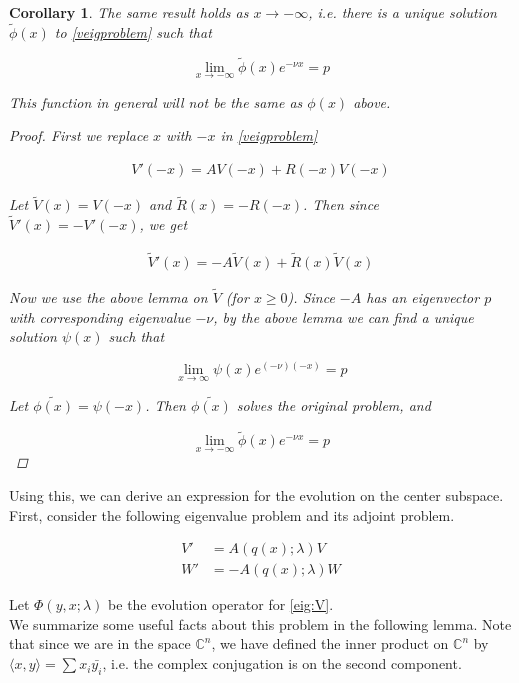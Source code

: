 \documentclass[12pt]{article}
\def\C{{\mathbb C}}
\newtheorem{corollary}{Corollary}
\begin{document}
\begin{corollary}The same result holds as $x \rightarrow -\infty$, i.e. there is a unique solution $\tilde{\phi}(x)$ to \eqref{veigproblem} such that 

\[
\lim_{x\rightarrow -\infty} \tilde{\phi}(x) e^{-\nu x} = p
\]

This function in general will not be the same as $\phi(x)$ above.

\begin{proof}
First we replace $x$ with $-x$ in \eqref{veigproblem}

\begin{align*}
V'(-x) = A V(-x) + R(-x)V(-x)
\end{align*}

Let $\tilde{V}(x) = V(-x)$ and $\tilde{R}(x) = -R(-x)$. Then since $\tilde{V}'(x) = -V'(-x)$, we get

\begin{align*}
\tilde{V}'(x) = -A \tilde{V}(x) + \tilde{R}(x)\tilde{V}(x)
\end{align*}

Now we use the above lemma on $\tilde{V}$ (for $x \geq 0$). Since $-A$ has an eigenvector $p$ with corresponding eigenvalue $-\nu$, by the above lemma we can find a unique solution $\psi(x)$ such that 

\[
\lim_{x\rightarrow \infty} \psi(x) e^{(-\nu)(-x)} = p
\]

Let $\tilde{\phi(x)} = \psi(-x)$. Then $\tilde{\phi(x)}$ solves the original problem, and

\[
\lim_{x\rightarrow -\infty} \tilde{\phi}(x) e^{-\nu x } = p
\]

\end{proof}
\end{corollary}

Using this, we can derive an expression for the evolution on the center subspace. First, consider the following eigenvalue problem and its adjoint problem.

\begin{align}
V' &= A(q(x); \lambda) V \label{eig:V} \\
W' &= -A(q(x); \lambda)W \label{eig:W}
\end{align}

Let $\Phi(y, x; \lambda)$ be the evolution operator for \eqref{eig:V}.\\

We summarize some useful facts about this problem in the following lemma. Note that since we are in the space $\C^n$, we have defined the inner product on $\C^n$ by $\langle x, y \rangle = \sum x_i \bar{y_i}$, i.e. the complex conjugation is on the second component.
\end{document}
